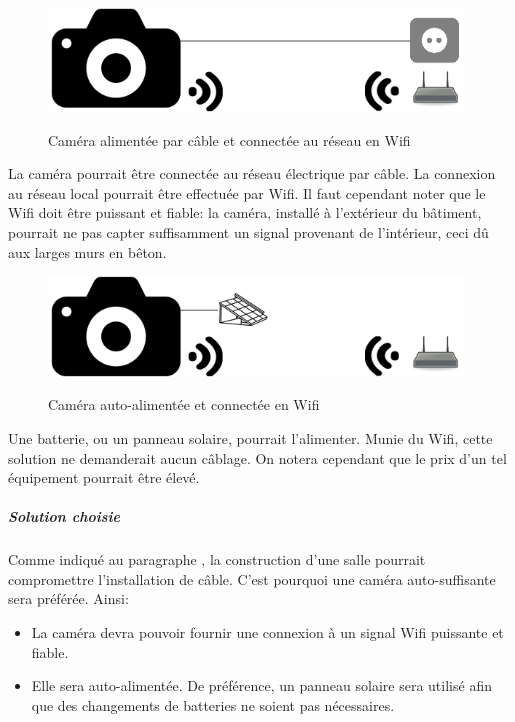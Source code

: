 \begin{figure}[H]
    \includegraphics[width=110mm]{img/conception/cam_con_3.png}
    \label{fig:cam_connection_3}
    \centering
    \caption{Caméra alimentée par câble et connectée au réseau en Wifi}
\end{figure}

La caméra pourrait être connectée au réseau électrique par câble. La connexion au réseau local pourrait être effectuée par Wifi. Il faut cependant noter que le Wifi doit être puissant et fiable: la caméra, installé à l'extérieur du bâtiment, pourrait ne pas capter suffisamment un signal provenant de l'intérieur, ceci dû aux larges murs en bêton. 

\begin{figure}[H]
    \includegraphics[width=110mm]{img/conception/cam_con_4.png}
    \label{fig:cam_connection_4}
    \centering
    \caption{Caméra auto-alimentée et connectée en Wifi}
\end{figure}

Une batterie, ou un panneau solaire, pourrait l'alimenter. Munie du Wifi, cette solution ne demanderait aucun câblage. On notera cependant que le prix d'un tel équipement pourrait être élevé.

\subparagraph{Solution choisie}

Comme indiqué au paragraphe , la construction d'une salle pourrait compromettre l'installation de câble. C'est pourquoi une caméra auto-suffisante sera préférée. Ainsi:
\begin{itemize}
    \item La caméra devra pouvoir fournir une connexion à un signal Wifi puissante et fiable.
    \item Elle sera auto-alimentée. De préférence, un panneau solaire sera utilisé afin que des changements de batteries ne soient pas nécessaires.
\end{itemize}

